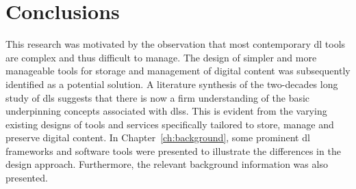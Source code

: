 \chapter{Conclusions\label{ch:conclusion}}


% 




%

%

%

% 


% 

This research was motivated by the observation that most contemporary \gls{dl} tools are complex and thus difficult to manage. The design of simpler and more manageable tools for storage and management of digital content was subsequently identified as a potential solution. A literature synthesis of the two-decades long study of \glspl{dl} suggests that there is now a firm understanding of the basic underpinning concepts associated with \glspl{dls}. This is evident from the varying existing designs of tools and services specifically tailored to store, manage and preserve digital content. In Chapter~\ref{ch:background}, some prominent \gls{dl} frameworks and software tools were presented to illustrate the differences in the design approach. Furthermore, the relevant background information was also presented.

